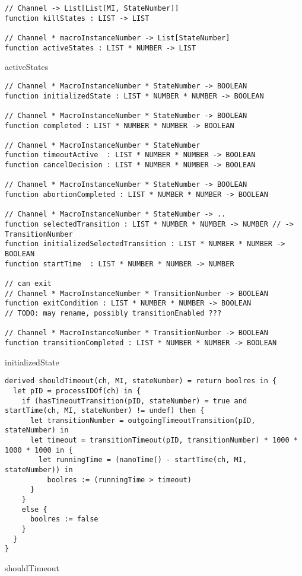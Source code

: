 \begin{listing}[H]
\begin{verbatim}
// Channel -> List[List[MI, StateNumber]]
function killStates : LIST -> LIST

// Channel * macroInstanceNumber -> List[StateNumber]
function activeStates : LIST * NUMBER -> LIST
\end{verbatim}
\caption{activeStates}
\label{lst:asm:activeStates}
\end{listing}



\begin{listing}[H]
\begin{verbatim}
// Channel * MacroInstanceNumber * StateNumber -> BOOLEAN
function initializedState : LIST * NUMBER * NUMBER -> BOOLEAN

// Channel * MacroInstanceNumber * StateNumber -> BOOLEAN
function completed : LIST * NUMBER * NUMBER -> BOOLEAN

// Channel * MacroInstanceNumber * StateNumber
function timeoutActive  : LIST * NUMBER * NUMBER -> BOOLEAN
function cancelDecision : LIST * NUMBER * NUMBER -> BOOLEAN

// Channel * MacroInstanceNumber * StateNumber -> BOOLEAN
function abortionCompleted : LIST * NUMBER * NUMBER -> BOOLEAN

// Channel * MacroInstanceNumber * StateNumber -> ..
function selectedTransition : LIST * NUMBER * NUMBER -> NUMBER // -> TransitionNumber
function initializedSelectedTransition : LIST * NUMBER * NUMBER -> BOOLEAN
function startTime  : LIST * NUMBER * NUMBER -> NUMBER

// can exit
// Channel * MacroInstanceNumber * TransitionNumber -> BOOLEAN
function exitCondition : LIST * NUMBER * NUMBER -> BOOLEAN
// TODO: may rename, possibly transitionEnabled ???

// Channel * MacroInstanceNumber * TransitionNumber -> BOOLEAN
function transitionCompleted : LIST * NUMBER * NUMBER -> BOOLEAN
\end{verbatim}
\caption{initializedState}
\label{lst:asm:initializedState}
\end{listing}



\begin{listing}[H]
\begin{verbatim}
derived shouldTimeout(ch, MI, stateNumber) = return boolres in {
  let pID = processIDOf(ch) in {
    if (hasTimeoutTransition(pID, stateNumber) = true and startTime(ch, MI, stateNumber) != undef) then {
      let transitionNumber = outgoingTimeoutTransition(pID, stateNumber) in
      let timeout = transitionTimeout(pID, transitionNumber) * 1000 * 1000 * 1000 in {
        let runningTime = (nanoTime() - startTime(ch, MI, stateNumber)) in
          boolres := (runningTime > timeout)
      }
    }
    else {
      boolres := false
    }
  }
}
\end{verbatim}
\caption{shouldTimeout}
\label{lst:asm:shouldTimeout}
\end{listing}


